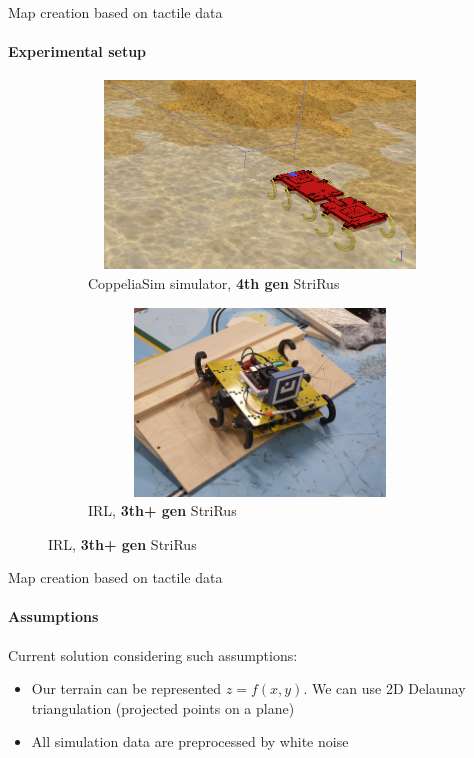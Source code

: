 \documentclass[aspectratio=169]{beamer}
\begin{document}
\begin{frame}[t]{Map creation based on tactile data}
    \framesubtitle{Experimental setup}
    \vspace{-15pt}
    \begin{figure}[H]
        \begin{subfigure}[t]{0.49\textwidth}
            \centering\includegraphics[height=5cm,width=1\textwidth,keepaspectratio]{coppelia_sim.png}
            \caption*{CoppeliaSim simulator, \textbf{4th gen} StriRus}
        \end{subfigure}
        \begin{subfigure}[t]{0.49\textwidth}
            \centering\includegraphics[height=5cm,width=1\textwidth,keepaspectratio]{rl_sim.JPG}
            \caption*{IRL, \textbf{3th+ gen} StriRus}
        \end{subfigure}
    \end{figure}
\end{frame}

\begin{frame}[t]{Map creation based on tactile data}
    \framesubtitle{Assumptions}
    \Large
    Current solution considering such assumptions:
    \begin{itemize}
        \item Our terrain can be represented $z = f(x,y)$. We can use 2D Delaunay triangulation (projected points on a plane)
        \item All simulation data are preprocessed by white noise
    \end{itemize}
\end{frame}
\end{document}
